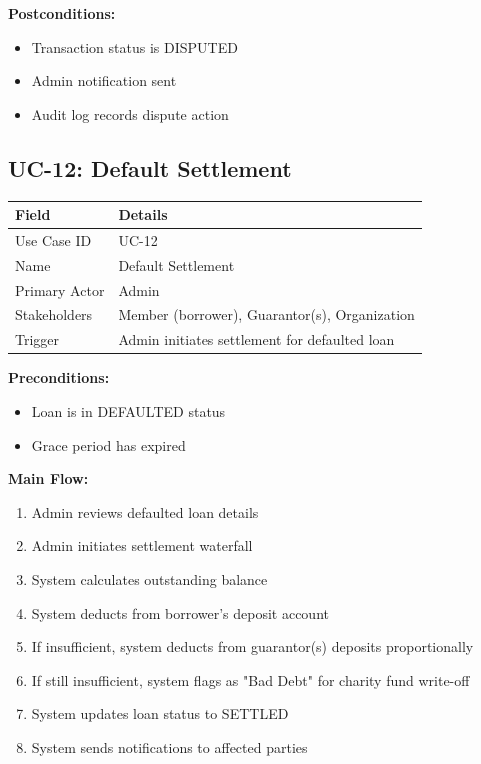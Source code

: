 \documentclass[11pt,a4paper]{article}
\begin{document}
\textbf{Postconditions:}
\begin{itemize}
    \item Transaction status is DISPUTED
    \item Admin notification sent
    \item Audit log records dispute action
\end{itemize}

\subsection{UC-12: Default Settlement}

\begin{tabular}{@{}p{3.5cm}p{9.5cm}@{}}
\toprule
\textbf{Field} & \textbf{Details} \\
\midrule
Use Case ID & UC-12 \\
Name & Default Settlement \\
Primary Actor & Admin \\
Stakeholders & Member (borrower), Guarantor(s), Organization \\
Trigger & Admin initiates settlement for defaulted loan \\
\bottomrule
\end{tabular}

\vspace{0.5em}
\textbf{Preconditions:}
\begin{itemize}
    \item Loan is in DEFAULTED status
    \item Grace period has expired
\end{itemize}

\textbf{Main Flow:}
\begin{enumerate}
    \item Admin reviews defaulted loan details
    \item Admin initiates settlement waterfall
    \item System calculates outstanding balance
    \item System deducts from borrower's deposit account
    \item If insufficient, system deducts from guarantor(s) deposits proportionally
    \item If still insufficient, system flags as "Bad Debt" for charity fund write-off
    \item System updates loan status to SETTLED
    \item System sends notifications to affected parties
\end{enumerate}
\end{document}
